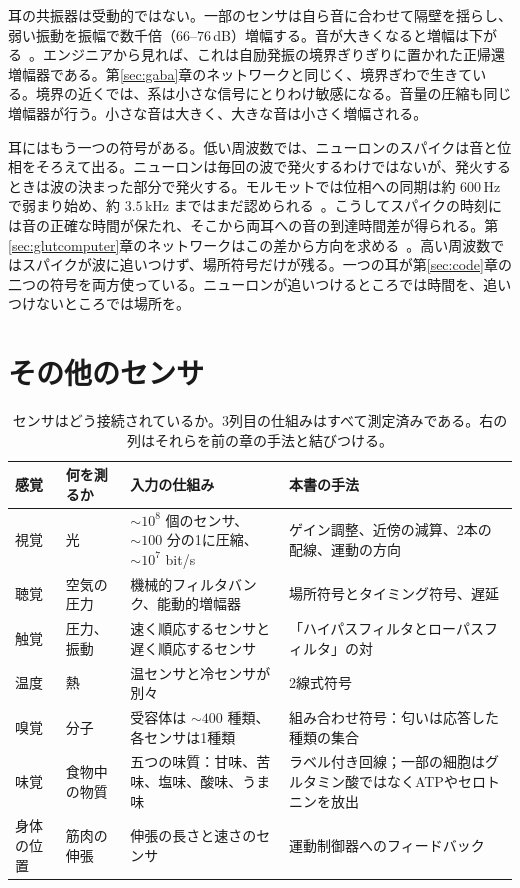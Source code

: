 耳の共振器は受動的ではない。一部のセンサは自ら音に合わせて隔壁を揺らし、弱い振動を振幅で数千倍（$66$--$76$\,dB）増幅する。音が大きくなると増幅は下がる~\cite{Ruggero1997,Robles2001}。エンジニアから見れば、これは自励発振の境界ぎりぎりに置かれた正帰還増幅器である。第\ref{sec:gaba}章のネットワークと同じく、境界ぎわで生きている。境界の近くでは、系は小さな信号にとりわけ敏感になる。音量の圧縮も同じ増幅器が行う。小さな音は大きく、大きな音は小さく増幅される。

耳にはもう一つの符号がある。低い周波数では、ニューロンのスパイクは音と位相をそろえて出る。ニューロンは毎回の波で発火するわけではないが、発火するときは波の決まった部分で発火する。モルモットでは位相への同期は約 $600$\,Hz で弱まり始め、約 $3.5$\,kHz まではまだ認められる~\cite{PalmerRussell1986}。こうしてスパイクの時刻には音の正確な時間が保たれ、そこから両耳への音の到達時間差が得られる。第\ref{sec:glutcomputer}章のネットワークはこの差から方向を求める~\cite{Grothe2010}。高い周波数ではスパイクが波に追いつけず、場所符号だけが残る。一つの耳が第\ref{sec:code}章の二つの符号を両方使っている。ニューロンが追いつけるところでは時間を、追いつけないところでは場所を。

\section{その他のセンサ}

\begin{table}[t]
\centering
\footnotesize
\setlength{\tabcolsep}{3pt}
\renewcommand{\arraystretch}{1.15}
\begin{tabular}{>{\raggedright}p{1.9cm}>{\raggedright}p{2.6cm}>{\raggedright}p{4.0cm}>{\raggedright\arraybackslash}p{4.6cm}}
\toprule
感覚 & 何を測るか & 入力の仕組み & 本書の手法 \\
\midrule
視覚 & 光 & $\sim10^8$ 個のセンサ、$\sim100$ 分の1に圧縮、$\sim10^7$ bit/s & ゲイン調整、近傍の減算、2本の配線、運動の方向 \\
聴覚 & 空気の圧力 & 機械的フィルタバンク、能動的増幅器 & 場所符号とタイミング符号、遅延 \\
触覚 & 圧力、振動 & 速く順応するセンサと遅く順応するセンサ & 「ハイパスフィルタとローパスフィルタ」の対 \\
温度 & 熱 & 温センサと冷センサが別々 & 2線式符号 \\
嗅覚 & 分子 & 受容体は $\sim400$ 種類、各センサは1種類 & 組み合わせ符号：匂いは応答した種類の集合 \\
味覚 & 食物中の物質 & 五つの味質：甘味、苦味、塩味、酸味、うま味 & ラベル付き回線；一部の細胞はグルタミン酸ではなくATPやセロトニンを放出 \\
身体の位置 & 筋肉の伸張 & 伸張の長さと速さのセンサ & 運動制御器へのフィードバック \\
\bottomrule
\end{tabular}
\caption{センサはどう接続されているか。3列目の仕組みはすべて測定済みである。右の列はそれらを前の章の手法と結びつける。}
\label{tab:sensors}
\end{table}

